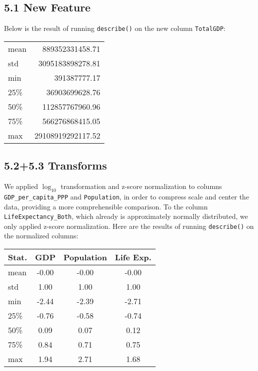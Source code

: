 \documentclass[14pt]{extarticle}
\begin{document}
\subsection*{5.1 New Feature}
Below is the result of running \texttt{describe()} on the new column \texttt{TotalGDP}:
\begin{center}
\begin{tabular}{ |l|r| }
  \hline
  mean&      889352331458.71\\
  std &     3095183898278.81\\
  min &         391387777.17\\
  25\% &       36903699628.76\\
  50\% &      112857767960.96\\
  75\% &      566276868415.05\\
  max &    29108919292117.52\\
  \hline
\end{tabular}
\end{center}
\subsection*{5.2+5.3 Transforms}
We applied $\log_{10}$ transformation and z-score normalization to columns\\
\texttt{GDP\_per\_capita\_PPP} and \texttt{Population}, in order to 
compress scale and center the data, providing a more comprehensible comparison.
To the column \texttt{LifeExpectancy\_Both}, which already is approximately normally distributed,
we only applied z-score normalization. Here are the results of running \texttt{describe()} on the
normalized columns:
\begin{center}
\begin{tabular}{ | l | c | c | c | }
  \hline
  Stat. & GDP & Population & Life Exp.\\
  \hline
  mean   &  -0.00 & -0.00 &-0.00\\
  std    &   1.00 &  1.00 & 1.00\\
  min    &  -2.44 & -2.39 &-2.71\\
  25\%   &  -0.76 & -0.58 &-0.74\\
  50\%   &   0.09 &  0.07 & 0.12\\
  75\%   &   0.84 &  0.71 & 0.75\\
  max    &   1.94 &  2.71 & 1.68\\
  \hline
\end{tabular}
\end{center}
\end{document}
